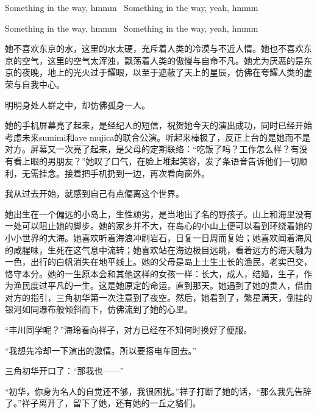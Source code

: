 \documentclass{article}
\begin{document}
Something in the way, hmmm~ Something in the way, yeah, hmmm~



Something in the way, hmmm~ Something in the way, yeah, hmmm~



她不喜欢东京的水，这里的水太硬，充斥着人类的冷漠与不近人情。她也不喜欢东京的空气，这里的空气太浑浊，飘荡着人类的傲慢与自命不凡。她尤为厌恶的是东京的夜晚，地上的光火过于耀眼，以至于遮蔽了天上的星辰，仿佛在夸耀人类的虚荣与自我中心。



明明身处人群之中，却仿佛孤身一人。



她的手机屏幕亮了起来，是经纪人的短信，祝贺她今天的演出成功，同时已经开始考虑未来sumimi和ave mujica的联合公演。听起来棒极了，反正上台的是她而不是对方。屏幕又一次亮了起来，是父母的定期联络：“吃饭了吗？工作怎么样？有没有看上眼的男朋友？”她叹了口气，在脸上堆起笑容，发了条语音告诉他们一切顺利，无需挂念。接着把手机扔到一边，再次看向窗外。



我从过去开始，就感到自己有点偏离这个世界。



她出生在一个偏远的小岛上，生性顽劣，是当地出了名的野孩子。山上和海里没有一处可以阻止她的脚步。她的家乡并不大，在岛心的小山上便可以看到环绕着她的小小世界的大海。她喜欢听着海浪冲刷岩石，日复一日周而复始；她喜欢闻着海风的咸腥味，生死在这气息中流转；她喜欢站在海边极目远眺，看着远方的海天融为一色，出行的白帆消失在地平线上。她的父母是岛上土生土长的渔民，老实巴交，恪守本分。她的一生原本会和其他这样的女孩一样：长大，成人，结婚，生子，作为渔民度过平凡的一生。这是她原定的命运，直到那天。她遇到了她的贵人，借由对方的指引，三角初华第一次注意到了夜空。然后，她看到了，繁星满天，倒挂的银河如同瀑布般倾斜而下，仿佛流到了她的心里。



\newpage



“丰川同学呢？”海玲看向祥子，对方已经在不知何时换好了便服。



“我想先冷却一下演出的激情。所以要搭电车回去。”



三角初华开口了：“那我也——”



“初华，你身为名人的自觉还不够，我很困扰。”祥子打断了她的话，“那么我先告辞了。”祥子离开了，留下了她，还有她的一丘之貉们。
\end{document}
